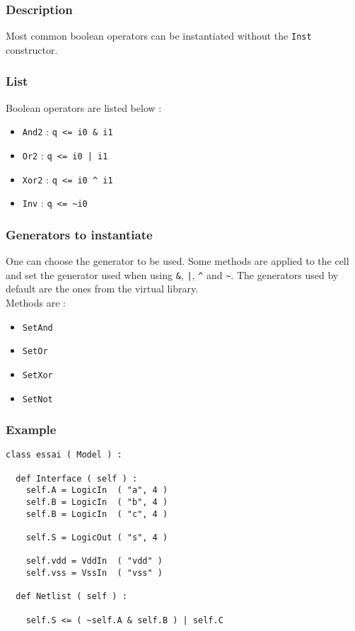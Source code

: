 \subsubsection{Description}

Most common boolean operators can be instantiated without the \verb-Inst- constructor.

\subsubsection{List}

Boolean operators are listed below :
\begin{itemize}
    \item \verb-And2- : \verb-q <= i0 & i1-
    \item \verb-Or2-  : \verb-q <= i0 | i1-
    \item \verb-Xor2- : \verb-q <= i0 ^ i1-
    \item \verb-Inv-  : \verb-q <= ~i0-
\end{itemize}


\subsubsection{Generators to instantiate}

One can choose the generator to be used. Some methods are applied to the cell and set the generator used when using \verb-&-, \verb-|-, \verb-^- and \verb-~-. The generators used by default are the ones from the virtual library.\\
        
\indent Methods are :
\begin{itemize}
    \item \verb-SetAnd-
    \item \verb-SetOr-
    \item \verb-SetXor-
    \item \verb-SetNot-
\end{itemize}

\subsubsection{Example}

\begin{verbatim}
class essai ( Model ) :

  def Interface ( self ) :
    self.A = LogicIn  ( "a", 4 )
    self.B = LogicIn  ( "b", 4 )
    self.B = LogicIn  ( "c", 4 )
    
    self.S = LogicOut ( "s", 4 )

    self.vdd = VddIn  ( "vdd" )
    self.vss = VssIn  ( "vss" )
	
  def Netlist ( self ) :

    self.S <= ( ~self.A & self.B ) | self.C
\end{verbatim}
  

